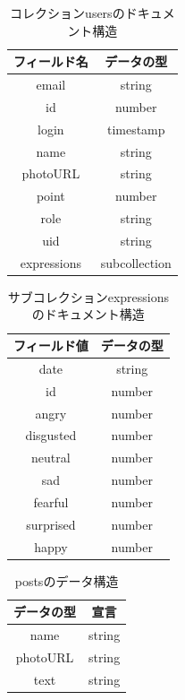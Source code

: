 \begin{table}[hbtp]
  \caption{コレクションusersのドキュメント構造}
  \label{table:data_type}
  \centering
  \begin{tabular}{c|c} \hline
    フィールド名  & データの型   \\ \hline
    email  & string   \\  
    id  & number   \\ 
    login  & timestamp  \\ 
    name  &  string  \\ 
    photoURL  &  string  \\ 
    point  &  number  \\ 
    role  &  string  \\ 
    uid  &  string  \\ 
    expressions  &  subcollection  \\ 
    \hline
  \end{tabular}
\end{table}



\clearpage

\begin{table}[hbtp]
  \caption{サブコレクションexpressionsのドキュメント構造}
  \label{table:data_type}
  \centering
  \begin{tabular}{c|c}\hline
    フィールド値  & データの型 \\\hline 
    date  & string  \\
    id  & number  \\
    angry  & number  \\
    disgusted  &  number  \\
    neutral  &  number  \\
    sad  &  number  \\
    fearful  &  number  \\
    surprised  &  number  \\
    happy  &  number  \\\hline
  \end{tabular}
\end{table}

\begin{table}[hbtp]
  \caption{postsのデータ構造}
  \label{table:data_type}
  \centering
  \begin{tabular}{c|c} \hline
    データの型  & 宣言   \\ \hline 
    name  & string  \\
    photoURL  & string  \\
    text  &  string \\ \hline
  \end{tabular}
\end{table}
